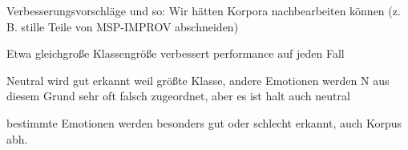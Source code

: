\documentclass{article} %
\begin{document}
Verbesserungsvorschläge und so: Wir hätten Korpora nachbearbeiten können (z. B. stille Teile von MSP-IMPROV abschneiden)

Etwa gleichgroße Klassengröße verbessert performance auf jeden Fall

Neutral wird gut erkannt weil größte Klasse, andere Emotionen werden N aus diesem Grund sehr oft falsch zugeordnet, aber es ist halt auch neutral

bestimmte Emotionen werden besonders gut oder schlecht erkannt, auch Korpus abh.

\pagebreak
\tableofcontents
\pagebreak


\end{document}
